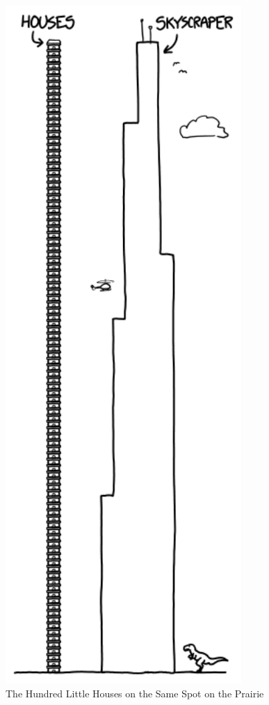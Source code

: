 {\begin{figure}[!htbp]
\centering
\includegraphics[scale=0.5, max width=0.8\textwidth]{imgs/a/94/billion_100.png}
\caption{The Hundred Little Houses on the Same Spot on the Prairie}
\end{figure}

}
